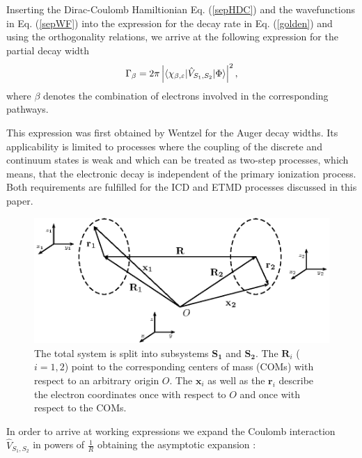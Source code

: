 Inserting the Dirac-Coulomb Hamiltionian Eq. (\ref{sepHDC}) and the wavefunctions
in Eq. (\ref{sepWF}) into the expression for the decay rate in Eq. (\ref{golden})
and using the orthogonality relations, we arrive at the following expression for
the partial decay width
\begin{equation}\label{relgolden}
 \Gamma_\beta=2\pi\left |\braket{\chi_{\beta,\varepsilon}|\hat{V}_{S_1,S_2}|\Phi}\right |^2,
\end{equation}
where $\beta$ denotes the combination of electrons involved in the corresponding pathways.

This expression was first obtained by Wentzel \cite{Wentzel27,Aagren92} for the Auger
decay widths. Its applicability is limited to processes where the coupling of the
discrete and continuum states is weak and which can be treated as two-step processes,
which means, that the electronic decay is independent of the primary ionization process.
Both requirements are fulfilled for the ICD and ETMD processes discussed in this paper.

\begin{figure}[ht]
\centering
\includegraphics[scale=1.0]{pics/taylor_pspic.eps}
%
\caption{The total system is split into subsystems $\mathbf{S_1}$ and $\mathbf{S_2}$.
The $\mathbf{R}_i$ ($i=1,2$)  point to the corresponding  centers of mass (COMs)
with respect to an arbitrary origin $O$. The $\mathbf{x}_i$ as well as the $\mathbf{r}_i$
describe the electron coordinates once with respect to $O$ and once with respect to the COMs.}
\label{taylor_pspic}
\end{figure}

In order to arrive at working expressions we expand the
Coulomb interaction $\hat{V}_{S_1,S_2}$ in powers of $\frac 1R$ obtaining the
asymptotic expansion \cite{santra2002}:

